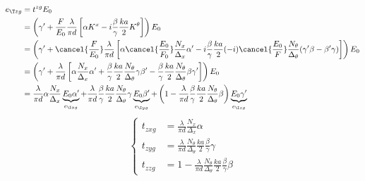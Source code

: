 \begin{refsection}
\begin{align*}
    e_{\T zg} &= t^{zg} E_0
    \\
    &=
    \left(
        \gamma' +
        \frac{F}{E_0}
        \frac{\lambda}{\pi d}
        \left[
            \alpha K^x - i \frac{\beta}{\gamma} \frac{ka}{2} K^\theta
        \right]
    \right)
    E_0
    \\
    &=
    \left(
        \gamma' +
        \cancel{\frac{F}{E_0}}
        \frac{\lambda}{\pi d}
        \left[
            \alpha
            \cancel{\frac{E_0}{F_0}}
            \frac{N_x}{\Delta_x}
            \alpha'
            -
            i
            \frac{\beta}{\gamma}
            \frac{ka}{2}
            (-i)
            \cancel{\frac{E_0}{F}}
            \frac{N_\theta}{\Delta_\theta}
            (\gamma' \beta - \beta' \gamma)
        \right]
    \right)
    E_0
    \\
    &=
    \left(
        \gamma' +
        \frac{\lambda}{\pi d}
        \left[
            \alpha
            \frac{N_x}{\Delta_x}
            \alpha'
            +
            \frac{\beta}{\gamma}
            \frac{ka}{2}
            \frac{N_\theta}{\Delta_\theta}
            \gamma
            \beta'
            -
            \frac{\beta}{\gamma}
            \frac{ka}{2}
            \frac{N_\theta}{\Delta_\theta}
            \beta
            \gamma'
        \right]
    \right)
    E_0
    \\
    &=
    \frac{\lambda}{\pi d}
    \alpha
    \frac{N_x}{\Delta_x}
    \underbrace{E_0 \alpha'}_{e_{\I xg}}
    +
    \frac{\lambda}{\pi d}
    \frac{\beta}{\gamma}
    \frac{ka}{2}
    \frac{N_\theta}{\Delta_\theta}
    \gamma
    \underbrace{E_0 \beta'}_{e_{\I yg}}
    +
    \left(
        1
        -
        \frac{\lambda}{\pi d}
        \frac{\beta}{\gamma}
        \frac{ka}{2}
        \frac{N_\theta}{\Delta_\theta}
        \beta
    \right)
    \underbrace{E_0 \gamma'}_{e_{\I zg}}
\end{align*}
\begin{equation}
    \left\lbrace
    \begin{aligned}
        t_{zxg}
        &= \frac{\lambda}{\pi d}
           \frac{N_x}{\Delta_x}
           \alpha
        \\
        t_{zyg}
        &= \frac{\lambda}{\pi d}
           \frac{N_\theta}{\Delta_\theta}
           \frac{ka}{2}
           \frac{\beta}{\gamma}
           \gamma
        \\
        t_{zzg}
        &= 1
           -
           \frac{\lambda}{\pi d}
           \frac{N_\theta}{\Delta_\theta}
           \frac{ka}{2}
           \frac{\beta}{\gamma}
           \beta
    \end{aligned}
    \right.
\end{equation}


\end{refsection}

